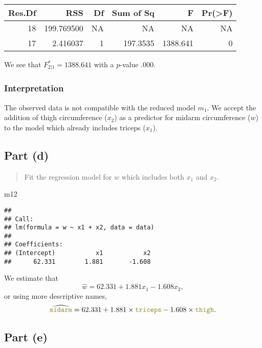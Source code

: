 \documentclass[
]{article}
\newenvironment{Shaded}{\begin{snugshade}}{\end{snugshade}}
\newcommand{\NormalTok}[1]{#1}
\begin{document}
\begin{longtable}[]{@{}rrrrrr@{}}
\toprule
Res.Df & RSS & Df & Sum of Sq & F & Pr(\textgreater F)\tabularnewline
\midrule
\endhead
18 & 199.769500 & NA & NA & NA & NA\tabularnewline
17 & 2.416037 & 1 & 197.3535 & 1388.641 & 0\tabularnewline
\bottomrule
\end{longtable}

We see that \(F^*_{2|1} = 1388.641\) with a \(p\)-value \(.000\).

\hypertarget{interpretation-1}{%
\subsubsection{Interpretation}\label{interpretation-1}}

The observed data is not compatible with the reduced model \(m_1\). We
accept the addition of thigh circumference (\(x_2\)) as a predictor for
midarm circumference (\(w\)) to the model which already includes triceps
(\(x_1\)).

\hypertarget{part-d}{%
\subsection{Part (d)}\label{part-d}}

\begin{quote}
Fit the regression model for \(w\) which includes both \(x_1\) and
\(x_2\).
\end{quote}

\begin{Shaded}
\begin{Highlighting}[]
\NormalTok{m12}
\end{Highlighting}
\end{Shaded}

\begin{verbatim}
## 
## Call:
## lm(formula = w ~ x1 + x2, data = data)
## 
## Coefficients:
## (Intercept)           x1           x2  
##      62.331        1.881       -1.608
\end{verbatim}

We estimate that \[
  \hat{w} = 62.331 + 1.881 x_1 - 1.608 x_2,
\] or using more descriptive names, \[
    \widehat{\texttt{\color{olive}midarm}} = 62.331 + 1.881 \times \texttt{\color{olive}triceps} - 1.608 \times \texttt{\color{olive}thigh}.
\]

\hypertarget{part-e}{%
\subsection{Part (e)}\label{part-e}}
\end{document}

